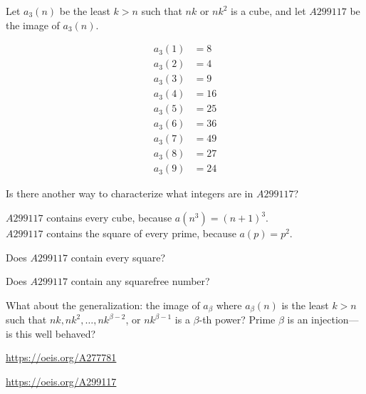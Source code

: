 \documentclass{article}
\begin{document}
Let $a_3(n)$ be the least $k > n$ such that $nk$ or $nk^2$ is a cube, and
let $A299117$ be the image of $a_3(n)$.
\begin{figure}[!h]
  \centering
  \begin{align*}
    a_3(1) &= 8\\
    a_3(2) &= 4\\
    a_3(3) &= 9\\
    a_3(4) &= 16\\
    a_3(5) &= 25\\
    a_3(6) &= 36\\
    a_3(7) &= 49\\
    a_3(8) &= 27\\
    a_3(9) &= 24
  \end{align*}
\end{figure}

\begin{question}
  Is there another way to characterize what integers are in $A299117$?
\end{question}

\begin{note}
  $A299117$ contains every cube, because $a(n^3) = (n + 1)^3$.\\
  $A299117$ contains the square of every prime, because $a(p) = p^2$.
\end{note}

\begin{related}
  \item Does $A299117$ contain every square?
  \item Does $A299117$ contain any squarefree number?
  \item What about the generalization: the image of $a_\beta$ where $a_\beta(n)$
    is the least $k > n$ such that $nk, nk^2, \hdots, nk^{\beta-2}$, or $nk^{\beta-1}$
    is a $\beta$-th power? Prime $\beta$ is an injection---is this well behaved?
\end{related}

\begin{references}
  \item \url{https://oeis.org/A277781}
  \item \url{https://oeis.org/A299117}
\end{references}
\end{document}

